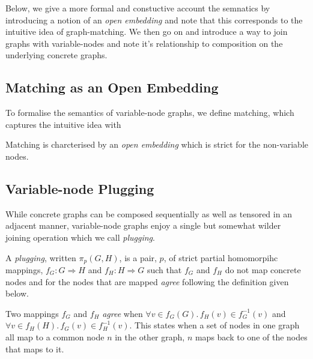 \documentclass[runningheads]{llncs}
\begin{document}

Below, we give a more formal and constuctive account the semnatics by
introducing a notion of an \emph{open embedding} and note that this
corresponds to the intuitive idea of graph-matching. We then go on and
introduce a way to join graphs with variable-nodes and note it's
relationship to composition on the underlying concrete graphs. 

\subsection{Matching as an Open Embedding}

To formalise the semantics of variable-node graphs, we define
matching, which captures the intuitive idea with

\begin{definition}
  Matching is charcterised by an \emph{open embedding} which is strict
  for the non-variable nodes.
\end{definition}



\subsection{Variable-node Plugging}

While concrete graphs can be composed sequentially as well as tensored
in an adjacent manner, variable-node graphs enjoy a single but
somewhat wilder joining operation which we call \emph{plugging}. 

\begin{definition}
  A \emph{plugging}, written $\pi_{p}(G,H)$, is a pair, $p$, of
  strict partial homomorpihc mappings, $f_G : G \Longrightarrow H$ and
  $f_H : H \Longrightarrow G$ such that $f_G$ and $f_H$ do not map
  concrete nodes and for the nodes that are mapped \emph{agree}
  following the definition given below.
\end{definition}

\begin{definition}
  Two mappings $f_G$ and $f_H$ \emph{agree} when $\forall v \in
  f_G(G).\, f_H(v) \in f^{-1}_G(v)$ and $\forall v \in f_H(H).\,
  f_G(v) \in f^{-1}_H(v)$. This states when a set of nodes in one
  graph all map to a common node $n$ in the other graph, $n$ maps back
  to one of the nodes that maps to it. 
\end{definition}
\end{document}
